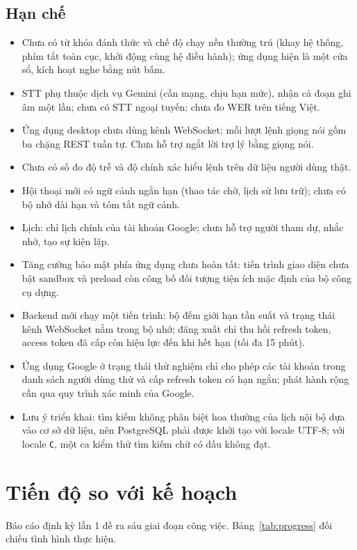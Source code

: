 \subsection{Hạn chế}\label{sec:limits}
\begin{itemize}
  \item Chưa có từ khóa đánh thức và chế độ chạy nền thường trú (khay hệ thống, phím tắt toàn cục, khởi động cùng hệ điều hành); ứng dụng hiện là một cửa sổ, kích hoạt nghe bằng nút bấm.
  \item STT phụ thuộc dịch vụ Gemini (cần mạng, chịu hạn mức), nhận cả đoạn ghi âm một lần; chưa có STT ngoại tuyến; chưa đo WER trên tiếng Việt.
  \item Ứng dụng desktop chưa dùng kênh WebSocket; mỗi lượt lệnh giọng nói gồm ba chặng REST tuần tự. Chưa hỗ trợ ngắt lời trợ lý bằng giọng nói.
  \item Chưa có số đo độ trễ và độ chính xác hiểu lệnh trên dữ liệu người dùng thật.
  \item Hội thoại mới có ngữ cảnh ngắn hạn (thao tác chờ, lịch sử lưu trữ); chưa có bộ nhớ dài hạn và tóm tắt ngữ cảnh.
  \item Lịch: chỉ lịch chính của tài khoản Google; chưa hỗ trợ người tham dự, nhắc nhở, tạo sự kiện lặp.
  \item Tăng cường bảo mật phía ứng dụng chưa hoàn tất: tiến trình giao diện chưa bật sandbox và preload còn công bố đối tượng tiện ích mặc định của bộ công cụ dựng.
  \item Backend mới chạy một tiến trình: bộ đếm giới hạn tần suất và trạng thái kênh WebSocket nằm trong bộ nhớ; đăng xuất chỉ thu hồi refresh token, access token đã cấp còn hiệu lực đến khi hết hạn (tối đa 15 phút).
  \item Ứng dụng Google ở trạng thái thử nghiệm chỉ cho phép các tài khoản trong danh sách người dùng thử và cấp refresh token có hạn ngắn; phát hành rộng cần qua quy trình xác minh của Google.
  \item Lưu ý triển khai: tìm kiếm không phân biệt hoa thường của lịch nội bộ dựa vào cơ sở dữ liệu, nên PostgreSQL phải được khởi tạo với locale UTF-8; với locale \texttt{C}, một ca kiểm thử tìm kiếm chữ có dấu không đạt.
\end{itemize}

\section{Tiến độ so với kế hoạch}\label{sec:progress}
Báo cáo định kỳ lần 1 đề ra sáu giai đoạn công việc. Bảng~\ref{tab:progress} đối chiếu tình hình thực hiện.

